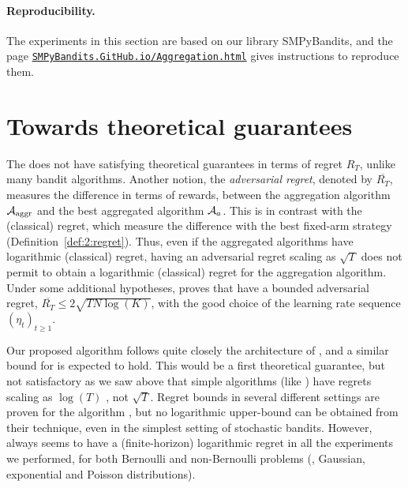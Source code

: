 \paragraph{Reproducibility.}
%
The experiments in this section are based on our library SMPyBandits,
and the page \href{https://SMPyBandits.GitHub.io/Aggregation.html}{\texttt{SMPyBandits.GitHub.io/Aggregation.html}} gives instructions to reproduce them.


\section{Towards theoretical guarantees}\label{sec:25:theory}

The \Aggr{} does not have satisfying theoretical guarantees in terms of regret $R_T$, unlike many bandit algorithms.
%
Another notion, the \emph{adversarial regret}, denoted by $\overline{R_T}$,
measures the difference in terms of rewards,
between the aggregation algorithm $\mathcal{A}_{\mathrm{aggr}}$ and the best aggregated algorithm $\mathcal{A}_a$. This is in contrast with the (classical) regret, which measure the difference with the best fixed-arm strategy (Definition~\ref{def:2:regret}).
Thus, even if the aggregated algorithms have logarithmic (classical) regret, having an adversarial regret scaling as $\sqrt{T}$ does not permit to obtain a logarithmic (classical) regret for the aggregation algorithm.
%
%
Under some additional hypotheses,
\cite[Theorem 4.2]{Bubeck12} proves that
\ExpQ{} have a bounded adversarial regret, %
$\overline{R_T} \leq 2 \sqrt{T N \log(K)}$,
with the good choice of the learning rate sequence $(\eta_t)_{t \geq 1}$.

Our proposed algorithm follows quite closely the architecture of \ExpQ,
and a similar bound for \Aggr{} is expected to hold.
%
This would be a first theoretical guarantee, but not satisfactory as we saw above that simple algorithms (like \UCB) have regrets scaling as $\log(T)$ \cite{Auer02,Bubeck12}, not $\sqrt{T}$.
%
Regret bounds in several different settings are proven for the \CORRAL{} algorithm \cite{Agarwal16}, but no logarithmic upper-bound can be obtained from their technique, even in the simplest setting of stochastic bandits.
%
However, \Aggr{} always seems to have a (finite-horizon) logarithmic regret in all the experiments we performed,
for both Bernoulli and non-Bernoulli problems (\eg, Gaussian, exponential and Poisson distributions).


